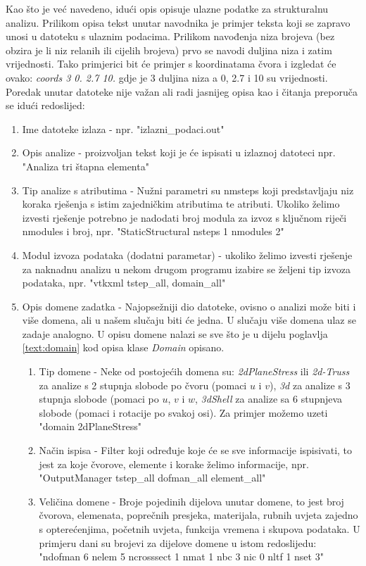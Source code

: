\documentclass[a4paper,twoside,12pt]{memoir} %
\begin{document}
Kao što je već navedeno, idući opis opisuje ulazne podatke za strukturalnu analizu. Prilikom opisa tekst unutar navodnika je primjer teksta koji se zapravo unosi u datoteku s ulaznim podacima. Prilikom navođenja niza brojeva (bez obzira je li niz relanih ili cijelih brojeva) prvo se navodi duljina niza i zatim vrijednosti. Tako primjerici bit će primjer s koordinatama čvora i izgledat će ovako: \textit{coords 3 0.  2.7  10.} gdje je 3 duljina niza a 0, 2.7 i 10 su vrijednosti. Poredak unutar datoteke nije važan ali radi jasnijeg opisa kao i čitanja preporuča se idući redoslijed:
\begin{enumerate}
    \item Ime datoteke izlaza - npr. "izlazni\_podaci.out"
    \item Opis analize - proizvoljan tekst koji je će ispisati u izlaznoj datoteci npr. "Analiza tri štapna elementa"
    \item Tip analize s atributima - Nužni parametri su nmsteps koji predstavljaju niz koraka rješenja s istim zajedničkim atributima te atributi. Ukoliko želimo izvesti rješenje potrebno je nadodati broj modula za izvoz s ključnom riječi nmodules i broj, npr. "StaticStructural nsteps 1 nmodules 2"
    \item Modul izvoza podataka (dodatni parametar) - ukoliko želimo izvesti rješenje za naknadnu analizu u nekom drugom programu izabire se željeni tip izvoza podataka, npr. "vtkxml tstep\_all, domain\_all"
    \item Opis domene zadatka - Najopsežniji dio datoteke, ovisno o analizi može biti i više domena, ali u našem slučaju biti će jedna. U slučaju više domena ulaz se zadaje analogno. U opisu domene nalazi se sve što je u dijelu poglavlja \ref{text:domain} kod opisa klase \textit{Domain} opisano.
    \begin{enumerate}
        \item Tip domene - Neke od postojećih domena su: \textit{2dPlaneStress} ili \textit{2d-Truss} za analize s 2 stupnja slobode po čvoru (pomaci $u$ i $v$), \textit{3d} za analize s 3 stupnja slobode (pomaci po $u$, $v$ i $w$, \textit{3dShell} za analize sa 6 stupnjeva slobode (pomaci i rotacije po svakoj osi). Za primjer možemo uzeti "domain 2dPlaneStress"
        \item Način ispisa - Filter koji određuje koje će se sve informacije ispisivati, to jest za koje čvorove, elemente i korake želimo informacije, npr. "OutputManager tstep\_all dofman\_all element\_all"
        \item Veličina domene - Broje pojedinih dijelova unutar domene, to jest broj čvorova, elemenata, poprečnih presjeka, materijala, rubnih uvjeta zajedno s opterećenjima, početnih uvjeta, funkcija vremena i skupova podataka. U primjeru dani su brojevi za dijelove domene u istom redoslijedu: "ndofman 6 nelem 5 ncrosssect 1 nmat 1 nbc 3 nic 0 nltf 1 nset 3"

\end{enumerate}
\end{enumerate}
\end{document}
